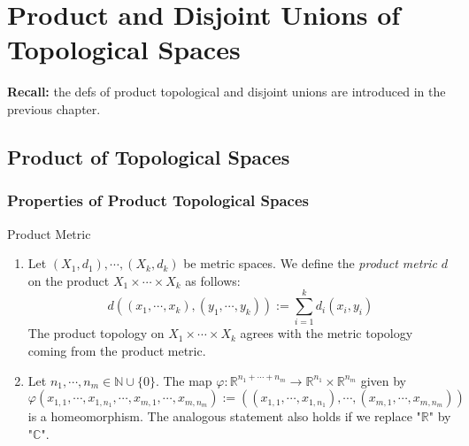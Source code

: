 \chapter{Product and Disjoint Unions of Topological Spaces}

\noindent\textbf{Recall:} the defs of product topological and disjoint unions are introduced in the previous chapter.

\section{Product of Topological Spaces}

\subsection{Properties of Product Topological Spaces}

\begin{proposition}{Product Metric}\\
\begin{enumerate}
    \item Let $(X_1 ,d_1) ,\cdots, (X_k,d_k)$ be metric spaces. We define the \textit{product metric} $d$ on the product $X_1 \times \cdots \times X_k$ as follows:
    $$d((x_1,\cdots,x_k) , (y_1 ,\cdots, y_k)) := \sum_{i=1}^k d_i (x_i,y_i)$$
    The product topology on $X_1 \times \cdots \times X_k$ agrees with the metric topology coming from the product metric.

    \item Let $n_1,\cdots,n_m \in \mathbb{N} \cup \{0\}$. The map $\varphi: \mathbb{R}^{n_1 + \cdots + n_m} \to \mathbb{R}^{n_1} \times \mathbb{R}^{n_m}$ given by
    $$\varphi(x_{1,1} ,\cdots, x_{1,n_1} ,\cdots, x_{m,1} ,\cdots, x_{m,n_m}) := ((x_{1,1} ,\cdots, x_{1,n_1}) , \cdots, (x_{m,1} ,\cdots, x_{m,n_m}))$$
    is a homeomorphism. The analogous statement also holds if we replace "$\mathbb{R}$" by "$\mathbb{C}$".
\end{enumerate}
\end{proposition}


